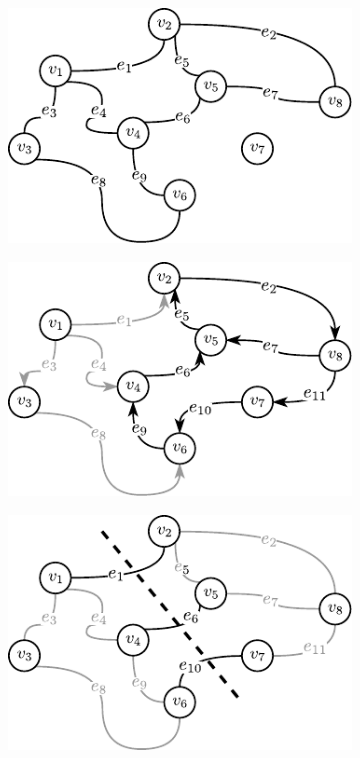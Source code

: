 \begin{figure}[!htbp]
	\null\hfill
	\begin{subfigure}[b]{0.32\textwidth}
		\includegraphics[width=\textwidth]{Chapter_I/DEF-example/a}
		\caption{}
		\label{fig:defExample:a}
	\end{subfigure}
	\hfill
	\begin{subfigure}[b]{0.32\textwidth}
		\includegraphics[width=\textwidth]{Chapter_I/DEF-example/b}
		\caption{}
		\label{fig:defExample:b}
	\end{subfigure}
	\hfill
	\begin{subfigure}[b]{0.32\textwidth}
		\includegraphics[width=\textwidth]{Chapter_I/DEF-example/c}

\end{subfigure}
\end{figure}
